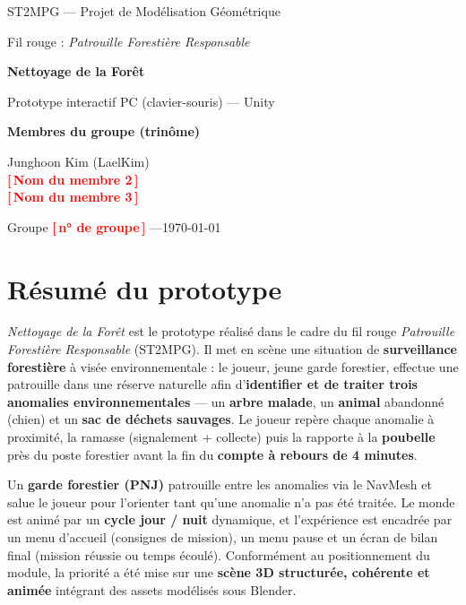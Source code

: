 \documentclass[11pt,a4paper]{article}
\newcommand{\todo}[1]{\textcolor{red}{\textbf{[\,#1\,]}}}
\begin{document}
\begin{titlepage}
\centering
\vspace*{2.2cm}
{\large ST2MPG --- Projet de Modélisation Géométrique\par}
{\large Fil rouge : \emph{Patrouille Forestière Responsable}\par}
\vspace{1.6cm}
{\Huge\bfseries\color{forest} Nettoyage de la Forêt\par}
\vspace{0.5cm}
{\Large Prototype interactif PC (clavier-souris) --- Unity\par}
\vspace{2cm}

{\large\bfseries Membres du groupe (trinôme)\par}
\vspace{0.4cm}
{\large
Junghoon Kim (LaelKim)\\[2pt]
\todo{Nom du membre 2}\\[2pt]
\todo{Nom du membre 3}\par}

\vfill
{\large Groupe \todo{n° de groupe} \quad---\quad \today\par}
\end{titlepage}

\tableofcontents
\newpage

\section{Résumé du prototype}
\emph{Nettoyage de la Forêt} est le prototype réalisé dans le cadre du fil rouge
\emph{Patrouille Forestière Responsable} (ST2MPG). Il met en scène une situation
de \textbf{surveillance forestière} à visée environnementale : le joueur, jeune
garde forestier, effectue une patrouille dans une réserve naturelle afin
d'\textbf{identifier et de traiter trois anomalies environnementales} --- un
\textbf{arbre malade}, un \textbf{animal} abandonné (chien) et un \textbf{sac de
déchets sauvages}. Le joueur repère chaque anomalie à proximité, la ramasse
(signalement + collecte) puis la rapporte à la \textbf{poubelle} près du poste
forestier avant la fin du \textbf{compte à rebours de 4 minutes}.

Un \textbf{garde forestier (PNJ)} patrouille entre les anomalies via le NavMesh et
salue le joueur pour l'orienter tant qu'une anomalie n'a pas été traitée. Le monde
est animé par un \textbf{cycle jour / nuit} dynamique, et l'expérience est encadrée
par un menu d'accueil (consignes de mission), un menu pause et un écran de bilan
final (mission réussie ou temps écoulé). Conformément au positionnement du module,
la priorité a été mise sur une \textbf{scène 3D structurée, cohérente et animée}
intégrant des assets modélisés sous Blender.
\end{document}
